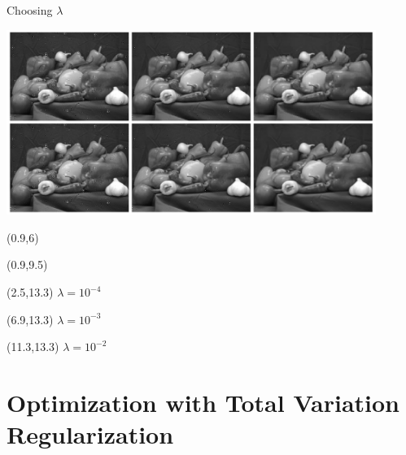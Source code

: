 \documentclass[12pt]{beamer}
\begin{document}
\begin{frame}{Choosing $\lambda$}
\begin{center}
\includegraphics[width=0.9\textwidth]{../figures/wavLam.pdf}
\end{center}

\begin{textblock}{5}(0.9,6)
\end{textblock}

\begin{textblock}{5}(0.9,9.5)
\end{textblock}

\begin{textblock}{5}(2.5,13.3)
$\lambda = 10^{-4}$
\end{textblock}

\begin{textblock}{5}(6.9,13.3)
$\lambda = 10^{-3}$
\end{textblock}

\begin{textblock}{5}(11.3,13.3)
$\lambda = 10^{-2}$
\end{textblock}

\end{frame}

\section{Optimization with Total Variation Regularization}
\end{document}
